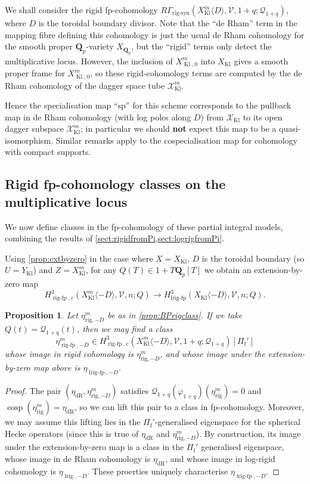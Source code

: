 \documentclass[cjm]{ipart}
\theoremstyle{plain}
\newtheorem{proposition}[theorem]{Proposition}
\theoremstyle{remark}
\DeclareMathOperator{\cosp}{cosp}
\DeclareMathOperator{\Kl}{Kl}
\DeclareMathOperator{\lrigfp}{lrig-fp}
\DeclareMathOperator{\lrig}{lrig}
\DeclareMathOperator{\rigfp}{rig-fp}
\DeclareMathOperator{\rigsyn}{rig-syn}
\newcommand{\Pif}{\Pi_{\mathrm{f}}}
\newcommand{\QQ}{\mathbf{Q}}
\newcommand{\Qp}{\QQ_p}
\newcommand{\cQ}{\mathcal{Q}}
\newcommand{\cV}{\mathcal{V}}
\newcommand{\cX}{\mathcal{X}}
\newcommand{\dR}{\mathrm{dR}}
\newcommand{\rig}{\mathrm{rig}}
\numberwithin{equation}{subsection}
\begin{document}
  \begin{remark}
   We shall consider the rigid fp-cohomology $R\Gamma_{\rigsyn}(X_{\Kl}^m\langle D \rangle, \cV, 1+q; \cQ_{1+q})$, where $D$ is the toroidal boundary divisor. Note that the ``de Rham'' term in the mapping fibre defining this cohomology is just the usual de Rham cohomology for the smooth proper $\Qp$-variety $X_{\Qp}$, but the ``rigid'' terms only detect the multiplicative locus. However, the inclusion of $X_{\Kl, 0}^m$ into $X_{\Kl}$ gives a smooth proper frame for $X_{\Kl, 0}^m$, so these rigid-cohomology terms are computed by the de Rham cohomology of the dagger space tube $\cX_{\Kl}^m$.

   Hence the specialisation map ``$\mathrm{sp}$'' for this scheme corresponds to the pullback map in de Rham cohomology (with log poles along $D$) from $\cX_{\Kl}$ to its open dagger subspace $\cX_{\Kl}^m$; in particular we should \textbf{not} expect this map to be a quasi-isomorphism. Similar remarks apply to the cospecialisation map for cohomology with compact supports.
  \end{remark}

 \subsection{Rigid fp-cohomology classes on the multiplicative locus}

  We now define classes in the fp-cohomology of these partial integral models, combining the results of \cref{sect:rigidfromPi,sect:logrigfromPi}.

  Using \cref{prop:extbyzero} in the case where $X = X_{\Kl}$, $D$ is the toroidal boundary (so $U=Y_{\Kl}$) and $Z=X_{\Kl}^{m}$, for any $Q(T)\in 1+T\Qp[T]$ we obtain an extension-by-zero map
  \[
   H^3_{\rigfp, c}(X_{\Kl}^{m}\langle -D\rangle, \cV, n;Q)\to  H^3_{\lrigfp}(X_{\Kl}\langle -D\rangle, \cV, n;Q).
  \]

  \begin{proposition}\label{prop:eta-rigsyn}
   Let $\eta_{\rig,-D}^m$ be as in \cref{prop:BPrigclass}. If we take $Q(t) = \cQ_{1+q}(t)$, then we may find a class
   \[ \eta_{\rigfp,-D}^{m} \in H^3_{\rigfp, c}(X_{\Kl}^{m}\langle -D\rangle, \cV, 1+q;\cQ_{1+q})[\Pif'] \]
   whose image in rigid cohomology is $\eta_{\rig,-D}^{m}$, and whose image under the extension-by-zero map above is $\eta_{\lrigfp,-D}$.
  \end{proposition}

  \begin{proof}
   The pair $(\eta_{\dR}, \eta^m_{\rig,-D})$ satisfies $\cQ_{1+q}(\varphi_{1+q})(\eta^m_{\rig}) = 0$ and $\cosp(\eta^m_{\rig}) = \eta_{\dR}$, so we can lift this pair to a class in fp-cohomology. Moreover, we may assume this lifting lies in the $\Pif'$-generalised eigenspace for the spherical Hecke operators (since this is true of $\eta_{\dR}$ and $\eta^m_{\rig,-D}$). By construction, its image under the extension-by-zero map is a class in the $\Pif'$ generalised eigenspace, whose image in de Rham cohomology is $\eta_{\dR}$, and whose image in log-rigid cohomology is $\eta_{\lrig, -D}$. These proerties uniquely characterise $\eta_{\lrigfp,-D}$.
  \end{proof}
\end{document}
